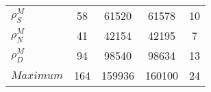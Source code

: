 \begin{center}
\begin{longtable}{lcccc}
$ {\rho^{M}_{S}}       $	 & 	                   58	 & 	                61520	 & 	                61578	 & 	                   10 \\ 
$ {\rho^{M}_{N}}       $	 & 	                   41	 & 	                42154	 & 	                42195	 & 	                    7 \\ 
$ {\rho^{M}_{D}}       $	 & 	                   94	 & 	                98540	 & 	                98634	 & 	                   13 \\ 
$Maximum               $	 & 	                  164	 & 	               159936	 & 	               160100	 & 	                   24 \\ 
\end{longtable}
 \end{center}
